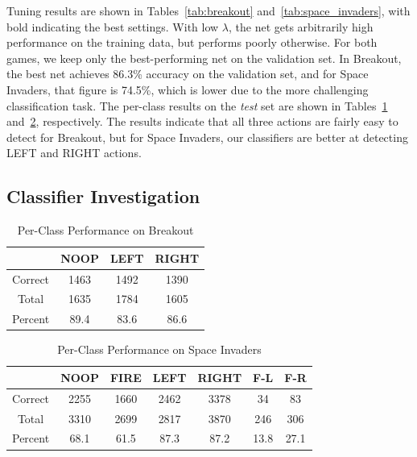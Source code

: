 \documentclass[letterpaper, 10pt, conference]{ieeeconf}
\begin{document}
Tuning results are shown in Tables~\ref{tab:breakout}
and~\ref{tab:space_invaders}, with bold indicating the best settings. With low
$\lambda$, the net gets arbitrarily high performance on the training data, but
performs poorly otherwise. For both games, we keep only the best-performing net
on the validation set. In Breakout, the best net achieves 86.3\% accuracy on the
validation set, and for Space Invaders, that figure is 74.5\%, which is lower
due to the more challenging classification task. The per-class results on the
\emph{test} set are shown in Tables~\ref{tab:breakout_perclass}
and~\ref{tab:spaceinv_perclass}, respectively. The results indicate that all
three actions are fairly easy to detect for Breakout, but for Space Invaders,
our classifiers are better at detecting LEFT and RIGHT actions.

\subsection{Classifier Investigation}

\begin{table}[!t]
\renewcommand{\arraystretch}{1.3}
\caption{Per-Class Performance on Breakout}
\label{tab:breakout_perclass}
\centering
\begin{tabular}{c c c c}
\hline
        & NOOP  & LEFT & RIGHT \\
\hline
Correct & 1463 & 1492 & 1390 \\
Total   & 1635 & 1784 & 1605 \\
Percent & 89.4 & 83.6 & 86.6 \\
\hline
\end{tabular}
\end{table}

\begin{table}[!t]
\renewcommand{\arraystretch}{1.3}
\caption{Per-Class Performance on Space Invaders}
\label{tab:spaceinv_perclass}
\centering
\begin{tabular}{c c c c c c c}
\hline
        & NOOP & FIRE & LEFT & RIGHT & F-L  & F-R  \\
\hline
Correct & 2255 & 1660 & 2462 & 3378  &  34  &   83 \\
Total   & 3310 & 2699 & 2817 & 3870  &  246 &  306 \\
Percent & 68.1 & 61.5 & 87.3 & 87.2  & 13.8 & 27.1 \\
\hline
\end{tabular}
\end{table}
\end{document}
